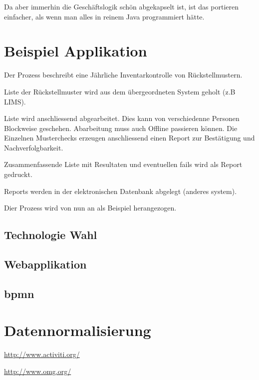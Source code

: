 \documentclass[paper=a4,twoside=false,BCOR=0mm,DIV=calc,fontsize=12pt]{scrartcl}
\begin{document}
Da aber immerhin die Geschäftslogik schön abgekapselt ist, ist das portieren einfacher, als wenn man alles in reinem Java programmiert
hätte.


\section{Beispiel Applikation}
Der Prozess beschreibt eine Jährliche Inventarkontrolle von Rückstellmustern.

Liste der Rückstellmuster wird aus dem übergeordneten System geholt (z.B LIMS). 

Liste wird anschliessend abgearbeitet. Dies kann von verschiedenne Personen Blockweise geschehen. Abarbeitung muss auch Offline passieren
können. Die Einzelnen Musterchecks erzeugen anschliessend einen Report zur Bestätigung und Nachverfolgbarkeit.

Zusammenfassende Liste mit Resultaten und eventuellen fails wird als Report gedruckt.

Reports werden in der elektronischen Datenbank abgelegt (anderes system). 

Dier Prozess wird von nun an als Beispiel herangezogen.

\subsection{Technologie Wahl}


\subsection{Webapplikation}

\subsection{bpmn}


\subsection{}



\section{Datennormalisierung}





\begin{thebibliography}{99}

 \url{http://www.activiti.org/}

 \url{http://www.omg.org/}




\end{thebibliography}
\end{document}
